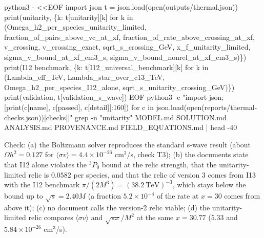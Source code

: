 \documentclass[
  10pt,
]{article}
\newenvironment{Shaded}{}{}
\newcommand{\NormalTok}[1]{#1}
\begin{document}
\begin{Shaded}
\begin{Highlighting}[]
\NormalTok{python3 {-} \textless{}\textless{}\textquotesingle{}EOF\textquotesingle{}}
\NormalTok{import json}
\NormalTok{t = json.load(open(\textquotesingle{}outputs/thermal.json\textquotesingle{}))}
\NormalTok{print(\textquotesingle{}unitarity\textquotesingle{}, \{k: t[\textquotesingle{}unitarity\textquotesingle{}][k] for k in (\textquotesingle{}Omega\_h2\_per\_species\_unitarity\_limited\textquotesingle{}, \textquotesingle{}fraction\_of\_pairs\_above\_vc\_at\_xf\textquotesingle{},}
\NormalTok{                                                   \textquotesingle{}fraction\_of\_rate\_above\_crossing\_at\_xf\textquotesingle{}, \textquotesingle{}v\_crossing\textquotesingle{}, \textquotesingle{}v\_crossing\_exact\textquotesingle{},}
\NormalTok{                                                   \textquotesingle{}sqrt\_s\_crossing\_GeV\textquotesingle{}, \textquotesingle{}x\_f\_unitarity\_limited\textquotesingle{}, \textquotesingle{}sigma\_v\_bound\_at\_xf\_cm3\_s\textquotesingle{},}
\NormalTok{                                                   \textquotesingle{}sigma\_v\_bound\_nonrel\_at\_xf\_cm3\_s\textquotesingle{})\})}
\NormalTok{print(\textquotesingle{}I12 benchmark\textquotesingle{}, \{k: t[\textquotesingle{}I12\_universal\_benchmark\textquotesingle{}][k] for k in (\textquotesingle{}Lambda\_eff\_TeV\textquotesingle{}, \textquotesingle{}Lambda\_star\_over\_c13\_TeV\textquotesingle{},}
\NormalTok{                                                                     \textquotesingle{}Omega\_h2\_per\_species\_I12\_alone\textquotesingle{}, \textquotesingle{}sqrt\_s\_unitarity\_crossing\_GeV\textquotesingle{})\})}
\NormalTok{print(\textquotesingle{}validation\textquotesingle{}, t[\textquotesingle{}validation\_s\_wave\textquotesingle{}])}
\NormalTok{EOF}
\NormalTok{python3 {-}c "import json; [print(c[\textquotesingle{}name\textquotesingle{}], c[\textquotesingle{}passed\textquotesingle{}], c[\textquotesingle{}detail\textquotesingle{}][:160]) for c in json.load(open(\textquotesingle{}reports/thermal{-}checks.json\textquotesingle{}))[\textquotesingle{}checks\textquotesingle{}]]"}
\NormalTok{grep {-}n "unitarity" MODEL.md SOLUTION.md ANALYSIS.md PROVENANCE.md FIELD\_EQUATIONS.md | head {-}40}
\end{Highlighting}
\end{Shaded}

Check: (a) the Boltzmann solver reproduces the standard s-wave result
(about \(\Omega h^2 = 0.127\) for
\(\langle\sigma v\rangle = 4.4\times10^{-26}\) cm\(^3\)/s, check T3);
(b) the documents state that I12 alone violates the \(^3P_0\) bound at
the relic strength, that the unitarity-limited relic is \(0.0582\) per
species, and that the relic of version 3 comes from I13 with the I12
benchmark \(\pi/(2M^3) = (38.2\ \text{TeV})^{-3}\), which stays below
the bound up to \(\sqrt s = 2.40M\) (a fraction \(5.2\times10^{-4}\) of
the rate at \(x = 30\) comes from above it); (c) no document calls the
version-2 relic viable; (d) the unitarity-limited relic compares
\(\langle\sigma v\rangle\) and \(\sqrt{\pi x}/M^2\) at the same
\(x = 30.77\) (\(5.33\) and \(5.84\times10^{-26}\) cm\(^3\)/s).
\end{document}
